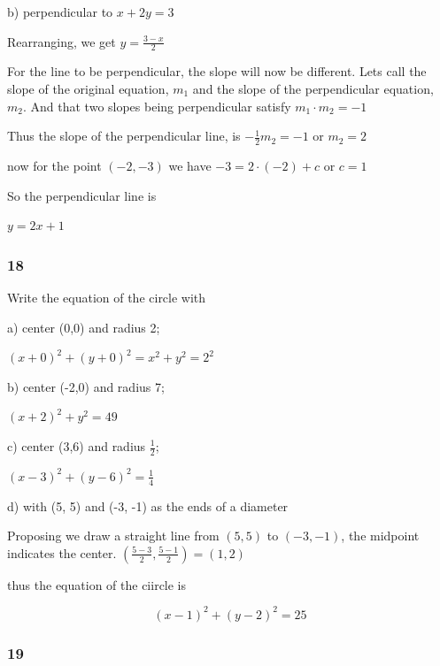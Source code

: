 \documentclass[]{report}
\begin{document}
b) perpendicular to $x + 2y = 3$

Rearranging, we get $y = \frac{3 - x}{2}$

For the line to be perpendicular, the slope will now be different. Lets call the slope of the original equation, $m_1$ and the slope of the perpendicular equation, $m_2$. And that two slopes being perpendicular satisfy $m_1\cdot m_2 = -1$

Thus the slope of the perpendicular line, is $-\frac{1}{2}m_2 = -1$ or $m_2 = 2$

now for the point $(-2, -3)$ we have $ -3 = 2 \cdot (-2) + c$ or $c = 1$

So the perpendicular line is

$y = 2x + 1$


\subsubsection{18}

Write the equation of the circle with

a) center (0,0) and radius 2;

$ (x + 0)^2 + (y+0)^2 = x^2 + y^2 = 2^2$


b) center (-2,0) and radius 7;

$(x+2)^2 +y^2 = 49$

c) center (3,6) and radius $\frac{1}{2}$;

$(x-3)^2 + (y-6)^2 = \frac{1}{4}$

d) with (5, 5) and (-3, -1) as the ends of a diameter

Proposing we draw a straight line from $(5, 5)$ to $(-3, -1)$, the midpoint indicates the center.
$(\frac{5-3}{2}, \frac{5-1}{2}) = (1, 2)$


thus the equation of the ciircle is 

\[
(x-1)^2 + (y-2)^2 = 25
\]

\subsubsection{19}
\end{document}
